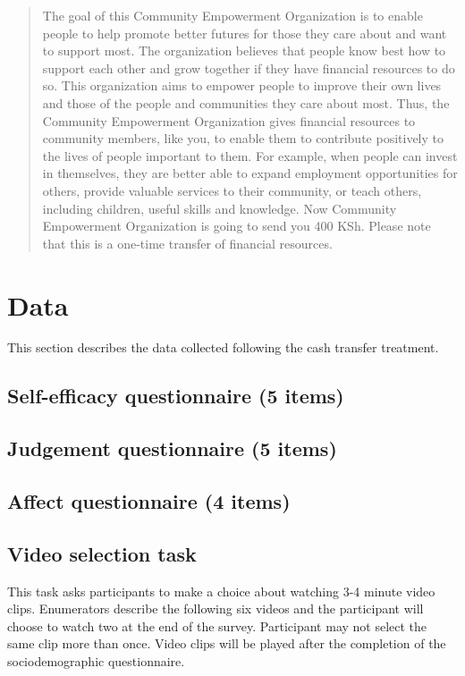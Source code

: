 \documentclass[11pt, a4paper]{article}\usepackage[]{graphicx}\usepackage[]{color}
\begin{document}
            \begin{quote}

                The goal of this Community Empowerment Organization is to enable people to help promote better futures for those they care about and want to support most. The organization believes that people know best how to support each other and grow together if they have financial resources to do so. This organization aims to empower people to improve their own lives and those of the people and communities they care about most. Thus, the Community Empowerment Organization gives financial resources to community members, like you, to enable them to contribute positively to the lives of people important to them. For example, when people can invest in themselves, they are better able to expand employment opportunities for others, provide valuable services to their community, or teach others, including children, useful skills and knowledge. Now Community Empowerment Organization is going to send you 400 KSh. Please note that this is a one-time transfer of financial resources.

            \end{quote}

\section{Data}

    This section describes the data collected following the cash transfer treatment.

    \subsection{Self-efficacy questionnaire (5 items)}
    \subsection{Judgement questionnaire (5 items)}
    \subsection{Affect questionnaire (4 items)}
    \subsection{Video selection task}

        This task asks participants to make a choice about watching 3-4 minute video clips. Enumerators describe the following six videos and the participant will choose to watch two at the end of the survey. Participant may not select the same clip more than once. Video clips will be played after the completion of the sociodemographic questionnaire.
\end{document}
